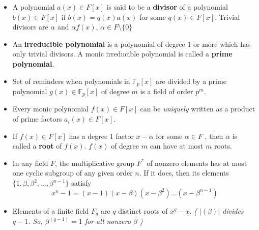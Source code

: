 \documentclass[a4paper]{article}
\theoremstyle{dotless}
\theoremstyle{dotless}
\theoremstyle{remark}
\begin{document}
\begin{itemize}
\item A polynomial $a(x) \in F[x]$ is said to be a \textbf{divisor} of a polynomial $b(x) \in F[x]$ if $b(x) = q(x)a(x)$ for some $q(x) \in F[x]$. Trivial divisors are $\alpha$ and $\alpha f(x)$, $\alpha \in  F \setminus \{0\}$

\item An \textbf{irreducible polynomial} is a polynomial of degree $1$ or more which has only trivial divisors. A monic irreducible polynomial is called a \textbf{prime polynomial}.

\item Set of reminders when polynomials in $\mathbb{F}_p[x]$ are divided by a prime polynomial $g(x) \in \mathbb{F}_p[x]$ of degree $m$ is a field of order $p^m$.

\item Every monic polynomial $f(x) \in F[x]$ can be \emph{uniquely} written as a product of prime factors $a_i(x) \in F[x]$. 

\item If $f(x) \in F[x]$ has a degree $1$ factor $x - \alpha$ for some $\alpha \in F$ , then $\alpha$ is called a \textbf{root} of $f(x)$. $f(x)$ of degree $m$ can have at most $m$ roots.

\item In any field $F$, the multiplicative group $F^*$ of nonzero elements has at most one cyclic subgroup of any given order $n$. If it does, then its elements $\{ 1,\beta, \beta^2, \dots, \beta^{n-1}\}$ satisfy $$x^n-1 = (x-1)(x-\beta)(x-\beta^2)\dots(x-\beta^{n-1})$$

\item Elements of a finite field $F_q$ are $q$ distinct roots of $x^q-x$. \textsl{( $|(\beta)|$ divides $q-1$. So, $\beta^{(q-1)} = 1$ for all nonzero $\beta $ )}
\end{itemize}
\end{document}
